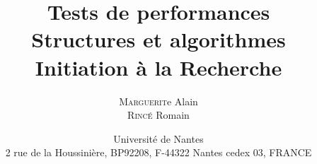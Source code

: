 \documentclass[11pt,a4paper,utf8x]{report}
\title{Tests de performances \\ Structures et algorithmes\\ Initiation à la Recherche}
\author{\textsc{Marguerit}e Alain\\ \textsc{Rincé} Romain}
\date{Université de Nantes \\ 2 rue de la Houssinière, BP92208, F-44322 Nantes cedex 03, FRANCE}
\begin{document}
\maketitle
\renewcommand{\labelitemi}{$\bullet$} 

\clearpage

\tableofcontents
\clearpage


%
%


%
%
\end{document}
